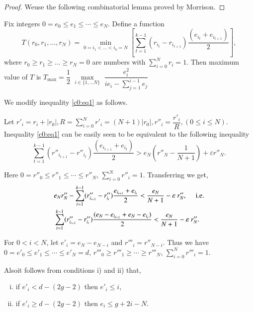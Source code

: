 {\begin{proof}
We\pageoriginale use  the following combinatorial lemma proved by
Morrison. 
\end{proof}

Fix integers  $0 = e_0 \leq e_1 \leq \cdots \leq e_N$. Define a
function  
$$
 T(r_0, r_1,\ldots, r_N) = \min\limits_{0 = i_1 < \dots
  < i_k =N}   \left[\sum\limits^{k-1}_{t=1}   (r_{i_t} - r_{i_{t+1}}) 
   \dfrac{(e_{i_{t}} + e_{i_{t+1}})}{2}\right],
$$ 
 where $r_0 \ge r_1 \ge \ldots \ge r_N =0 $ are numbers with
 $\sum\limits^{N}_{i=0} r_i = 1$. Then maximum value of $T$ is
 $T_{\max}= \dfrac{1}{2}$  $\max\limits_{i \in \{1, \ldots N\} }$ 
$\dfrac{e^2_i}{ie_i - \sum\limits^{i-1}_{j=1} e_j}$  

We modify inequality \eqref{c0:eq1} as follows.

\noindent
Let $r'_i = r_i +  \mid r_0 \mid, R = \sum\limits^{N}_{i=0} r'_i =
(N+1) | r_0 |, r''_i  = \dfrac{r'_i}{R}, (0 \leq i \leq N)$. 
Inequality \eqref{c0:eq1} can be easily seen to be equivalent to the following
inequality 
$$
\sum^{k-1}_{t=1} (r''_{i_{t+1}} - r''_{i_{t}}) \frac{(e_{i_{t+1}} +
  e_{i_{t}})}{2} > e_N (r''_N - \frac{1}{N+1})  + \varepsilon r''_N. 
$$

\noindent
Here  $0 = r''_0 \leq r''_1  \leq \cdots \leq r''_N$,
$\sum\limits^{N}_{i=0} r''_i = 1$. Transferring we get,  
\begin{align*}
& e_N r''_N -  \sum\limits^{k-1}_{t=1} (r''_{i_{t+1}} - r''_{i_{t}})
\dfrac{e_{i_{t+1}}+ e_{i_{t}}}{2} <  \dfrac{e_N}{N+1}  - \varepsilon ~
r''_N, \quad \; {\rm i.e.} \\
& \sum^{k-1}_{t=1} (r''_{i_{t+1}} - r''_{i_{t}}) \frac{(e_N - e_{i_{t+1}}+
  e_N - e_{i_{t}})}{2} <  \frac{e_N}{N+1}  - \varepsilon ~ r''_N.
\end{align*}

For  $ 0 < i < N$, let $e'_i = e_N - e_{N-i}$ and  $r'''_i =
r''_{N-i}$. Thus we have $0 = e'_0 \leq e'_1 \leq \cdots \leq e'_N =
d$, \; $r'''_0 \ge r'''_1 \ge \cdots \ge r'''_N$,  $\sum
\limits^{N}_{i=0}  r'''_i = 1$. 

\noindent
Also\pageoriginale it follows from conditions  i)  and  ii) that,
 \begin{enumerate}[i)]
\item  if  $e'_i < d - (2g- 2)$ then $e'_i \leq i$,

\item if $e'_i \geq d - (2g-2) $ then $e_i \leq g+2i - N$.
\end{enumerate}

}
